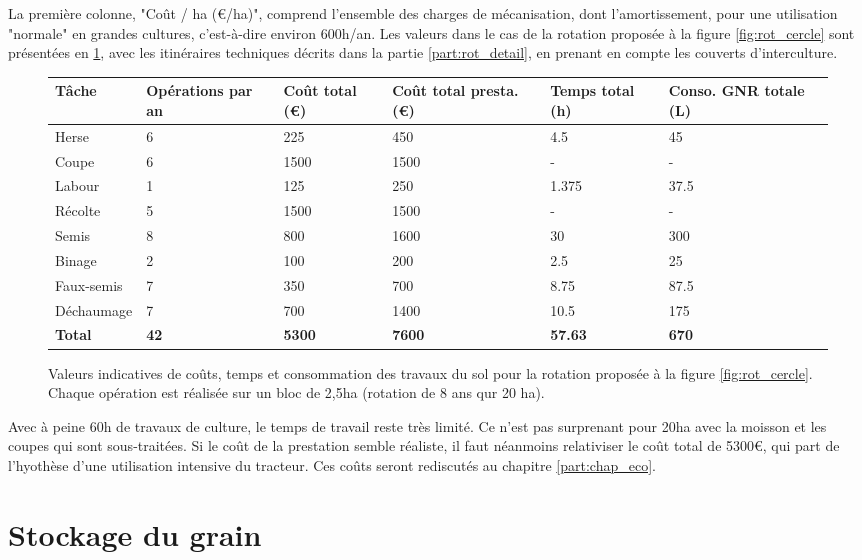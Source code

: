 \documentclass{book}
\begin{document}
La première colonne, "Coût / ha (\euro{}/ha)", comprend l'ensemble des charges de mécanisation, dont l'amortissement, pour une utilisation "normale" en grandes cultures, c'est-à-dire environ 600h/an. Les valeurs dans le cas de la rotation proposée à la figure \ref{fig:rot_cercle} sont présentées en \ref{tab:W_sol2}, avec les itinéraires techniques décrits dans la partie \ref{part:rot_detail}, en prenant en compte les couverts d'interculture.

\begin{figure}[h!]
\center
\begin{tabular}{ | p{2cm} | p{2cm}| p{2cm}| p{2cm} | p{} | p{2cm} | }
\hline
	Tâche & Opérations par an & Coût total (\euro{}) & Coût total presta. (\euro{}) & Temps total (h) & Conso. GNR totale (L) \\ \hline
	Herse & 6 & 225 & 450 & 4.5 & 45 \\ \hline
	Coupe & 6 & 1500 & 1500 & - & - \\ \hline
	Labour & 1 & 125 & 250 & 1.375 & 37.5 \\ \hline
	Récolte & 5 & 1500 & 1500 & - & - \\ \hline
	Semis & 8 & 800 & 1600 & 30 & 300 \\ \hline
	Binage & 2 & 100 & 200 & 2.5 & 25 \\ \hline
	Faux-semis & 7 & 350 & 700 & 8.75 & 87.5 \\ \hline
	Déchaumage & 7 & 700 & 1400 & 10.5 & 175 \\ \hline
	\textbf{Total} & \textbf{42} & \textbf{5300} & \textbf{7600} & \textbf{57.63} & \textbf{670} \\ \hline
\end{tabular}
\caption{Valeurs indicatives de coûts, temps et consommation des travaux du sol pour la rotation proposée à la figure \ref{fig:rot_cercle}. Chaque opération est réalisée sur un bloc de 2,5ha (rotation de 8 ans qur 20 ha).}
\label{tab:W_sol2}
\end{figure}

Avec à peine 60h de travaux de culture, le temps de travail reste très limité. Ce n'est pas surprenant pour 20ha avec la moisson et les coupes qui sont sous-traitées. Si le coût de la prestation semble réaliste, il faut néanmoins relativiser le coût total de 5300\euro{}, qui part de l'hyothèse d'une utilisation intensive du tracteur. Ces coûts seront rediscutés au chapitre \ref{part:chap_eco}.


\section{Stockage du grain}
\end{document}
